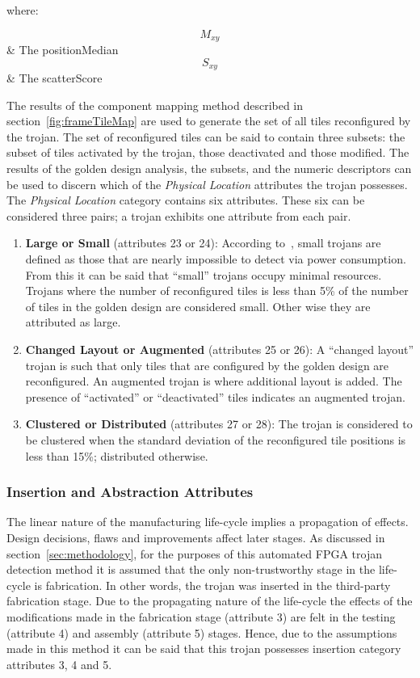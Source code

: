 where:
\begin{conditions}
	$$M_{xy}$$     &  The \gls{positionMedian} \\   
	$$S_{xy}$$     &  The \gls{scatterScore}
\end{conditions}
\normalsize

The results of the component mapping method described in section~\ref{fig:frameTileMap} are used to generate the set of all tiles reconfigured by the trojan.
The set of reconfigured tiles can be said to contain three subsets: the subset of tiles activated by the trojan, those deactivated and those modified. 
The results of the golden design analysis, the subsets, and the numeric descriptors can be used to discern which of the \textit{Physical Location} attributes the trojan possesses. 
The \textit{Physical Location} category contains six attributes.
These six can be considered three pairs; a trojan exhibits one attribute from each pair. 
\begin{enumerate}
	\item \textbf{Large or Small} (attributes 23 or 24): According to~\cite{samerAttribute}, small trojans are defined as those that are nearly impossible to detect via power consumption. From this it can be said that ``small'' trojans occupy minimal resources. Trojans where the number of reconfigured tiles is less than 5\% of the number of tiles in the golden design are considered small. Other wise they are attributed as large.
	\item \textbf{Changed Layout or Augmented} (attributes 25 or 26): A ``changed layout'' trojan is such that only tiles that are configured by the golden design are reconfigured. An augmented trojan is where additional layout is added. The presence of ``activated'' or ``deactivated'' tiles indicates an augmented trojan. 
	\item \textbf{Clustered or Distributed} (attributes 27 or 28): The trojan is considered to be clustered when the standard deviation of the reconfigured tile positions is less than 15\%; distributed otherwise.
\end{enumerate}
\subsubsection{Insertion and Abstraction Attributes}
The linear nature of the manufacturing life-cycle implies a propagation of effects.
Design decisions, flaws and improvements affect later stages.
As discussed in section~\ref{sec:methodology}, for the purposes of this automated \acrshort{FPGA} trojan detection method it is assumed that the only non-trustworthy stage in the life-cycle is fabrication.
In other words, the trojan was inserted in the third-party fabrication stage.
Due to the propagating nature of the life-cycle the effects of the modifications made in the fabrication stage (attribute 3) are felt in the testing (attribute 4) and assembly (attribute 5) stages.
Hence, due to the assumptions made in this method it can be said that this trojan possesses insertion category attributes 3, 4 and 5.

